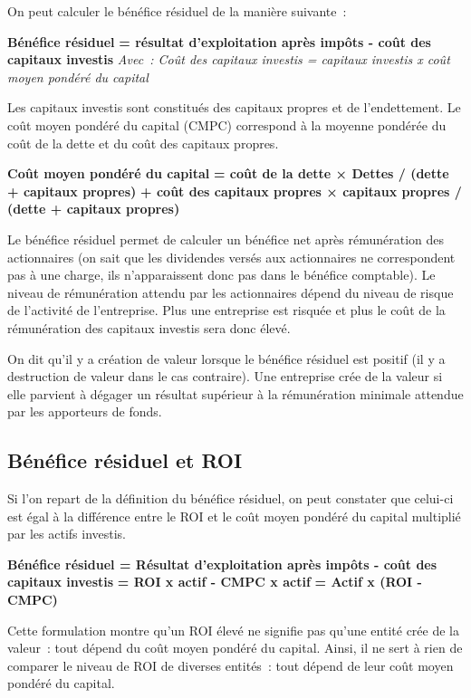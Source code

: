 \documentclass[oneside]{kaobook}
\begin{document}
On peut calculer le bénéfice résiduel de la manière suivante :
\begin{center}
\textbf{Bénéfice résiduel}
\textbf{= résultat d'exploitation après impôts - coût des capitaux investis}
\emph{Avec : Coût des capitaux investis = capitaux investis x coût moyen pondéré du
capital}
\end{center}
Les capitaux investis sont constitués des capitaux propres et de
l'endettement. Le coût moyen pondéré du capital (CMPC) correspond à la moyenne pondérée
du coût de la dette et du coût des capitaux propres.
\begin{center}
\textbf{Coût moyen pondéré du capital} 
\textbf{=  coût de la dette × Dettes / (dette + capitaux propres)} 
\textbf{+ coût des capitaux propres × capitaux propres / (dette + capitaux propres)}
\end{center}

Le bénéfice résiduel permet de calculer un bénéfice net après rémunération des actionnaires (on sait que les dividendes versés aux actionnaires ne correspondent pas à une charge, ils n'apparaissent donc pas dans le bénéfice comptable). Le niveau de rémunération attendu par les actionnaires dépend du niveau de risque de l'activité de l'entreprise. Plus une entreprise est risquée et plus le coût de la rémunération des capitaux investis sera donc élevé.

On dit qu'il y a création de valeur lorsque le bénéfice résiduel est positif (il y a destruction de valeur dans le cas contraire). Une entreprise crée de la valeur si elle parvient à dégager un résultat supérieur à la rémunération minimale attendue par les apporteurs de fonds.

\subsection{Bénéfice résiduel et ROI}
\label{sec:orge870a05}
Si l'on repart de la définition du bénéfice résiduel, on peut constater que celui-ci est égal à la différence entre le ROI et le coût moyen pondéré du capital multiplié par les actifs investis. 

\begin{center}
\textbf{Bénéfice résiduel = Résultat d'exploitation après impôts - coût des
capitaux investis}
\textbf{= ROI x actif - CMPC x actif}
\textbf{= Actif x (ROI - CMPC)}
\end{center}

Cette formulation montre qu'un ROI élevé ne signifie pas qu'une entité crée de la valeur : tout dépend du coût moyen pondéré du capital. Ainsi, il ne sert à rien de comparer le niveau de ROI de diverses entités : tout dépend de leur coût moyen pondéré du capital. 
\end{document}
